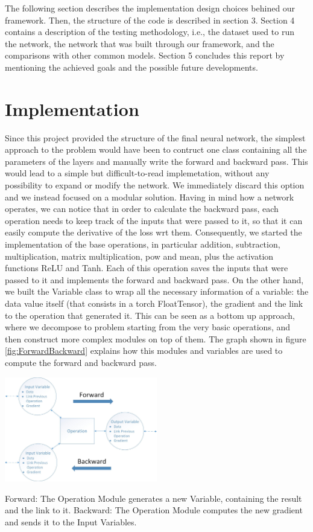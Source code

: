 \documentclass[10pt,conference,compsocconf]{IEEEtran}
\begin{document}
The following section describes the implementation design choices behined our framework. Then, the structure of the code is described in section 3. Section 4 contains a description of the testing methodology, i.e., the dataset used to run the network, the network that was built through our framework, and the comparisons with other common models. Section 5 concludes this report by mentioning the achieved goals and the possible future developments.
\section{Implementation}
	Since this project provided the structure of the final neural network, the simplest approach to the problem would have been to contruct one class containing all the parameters of the layers and manually write the forward and backward pass. This would lead to a simple but difficult-to-read implemetation, without any possibility to expand or modify the network. We immediately discard this option and we instead focused on a modular solution.
	Having in mind how a network operates, we can notice that in order to calculate the backward pass, each operation needs to keep track of the inputs that were passed to it, so that it can easily compute the derivative of the loss wrt them. Consequently, we started the implementation of the base operations, in particular addition, subtraction, multiplication, matrix multiplication, pow and mean, plus the activation functions ReLU and Tanh. Each of this operation saves the inputs that were passed to it and implements the forward and backward pass. On the other hand, we built the Variable class to wrap all the necessary information of a variable: the data value itself (that consists in a torch FloatTensor), the gradient and the link to the operation that generated it. This can be seen as a bottom up approach, where we decompose to problem starting from the very basic operations, and then construct more complex modules on top of them. The graph shown in figure \ref{fig:ForwardBackward} explains how this modules and variables are used to compute the forward and backward pass.
	\begin{center}
		\captionsetup{type=figure}
		\includegraphics[width=0.5\textwidth]{img/ForwardBackward.jpg}
		\caption {Forward: The Operation Module generates a new Variable, containing the result and the link to it. Backward: The Operation Module computes the new gradient and sends it to the Input Variables.}
		\label{fig:ForwardBackward}
	\end{center}
\end{document}
